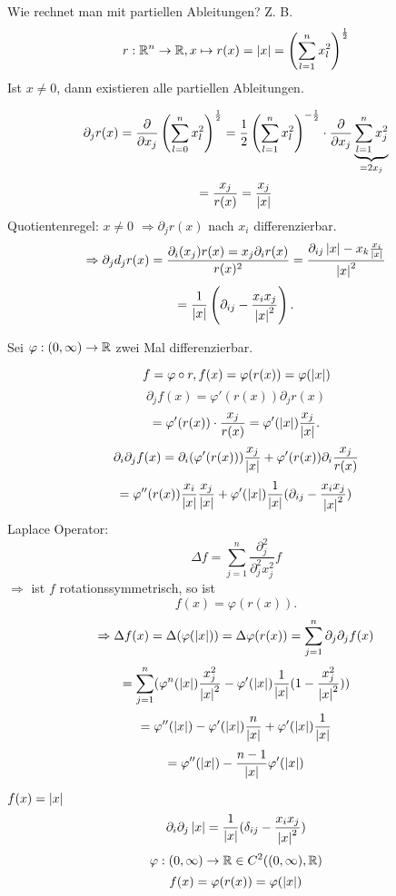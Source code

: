 \documentclass[../ana2.tex]{subfiles}
\begin{document}
Wie rechnet man mit partiellen Ableitungen?
Z. B. \[ r:\mathbb{R}^n\rightarrow \mathbb{R}, x \mapsto r(x) = \left|x\right| 
= \left( \sum_{l=1}^n x_l^2 \right)^{\frac{1}{2}} \]
Ist \( x \neq 0 \), dann existieren alle partiellen Ableitungen.

\[ \partial_j r(x) = \frac{\partial}{\partial x_j} 
\left( \sum_{l=0}^n x_l^2 \right)^{\frac{1}{2}} 
= \frac{1}{2} \left( \sum_{l=1}^n x_l^2 \right)^{-\frac{1}{2}} 
\cdot \frac{\partial}{\partial x_j} \underbrace{\sum_{l=1}^n x_j^2}_{=2x_j} \]
\[ = \frac{x_j}{r(x)} = \frac{x_j}{\left|x\right|} \]
Quotientenregel: \( x \neq 0 \)
\( \Rightarrow \partial_j r(x) \) nach \( x_i \) 
differenzierbar.
\[ \Rightarrow \partial_j d_j r(x) 
= \frac{ \partial_i(x_j) r(x) = x_j \partial_i r(x) }{r(x)^2} 
= \frac{\partial_{ij} \left|x\right| - x_k \frac{x_i}{\left|x\right|}}{\left|x\right|^2} \]
\[ = \frac{1}{\left|x\right|} \left( \partial_{ij} - \frac{x_i x_j}{\left|x\right|^2} \right). \]

Sei \( \varphi:(0,\infty)\rightarrow \mathbb{R} \) zwei Mal differenzierbar. 

\[ f = \varphi \circ r, f(x) = \varphi(r(x)) = \varphi(\left|x\right|) \]
\[ \partial_j f(x) = \varphi'(r(x)) \partial_j r(x) \]
\[ = \varphi'(r(x)) \cdot \frac{x_j}{r(x)} 
= \varphi'(\left|x\right|) \frac{x_j}{\left|x\right|}. \]
\[ \partial_i \partial_j f(x) = \partial_i(\varphi'(r(x))) 
\frac{x_j}{\left|x\right|} + \varphi'(r(x)) \partial_i \frac{x_j}{r(x)} \]
\[ = \varphi''(r(x)) \frac{x_i}{\left|x\right|} \frac{x_j}{\left|x\right|} 
+ \varphi'(\left|x\right|) \frac{1}{\left|x\right|} (\partial_{ij} - \frac{x_i x_j}{\left|x\right|^2}) \]
Laplace Operator:
\[ \Delta f = \sum_{j=1}^n \frac{\partial_j^2}{\partial_j^2 x_j^2} f \]
\( \Rightarrow \) ist \(f\) rotationssymmetrisch, so ist 
\[ f(x) = \varphi(r(x)). \]
\[ \Rightarrow \Delta f(x) = \Delta(\varphi(\left|x\right|)) 
= \Delta \varphi(r(x)) = \sum_{j=1}^n 
\partial_j \partial_j f(x) \]
\[ = \sum_{j=1}^n (\varphi^n(\left|x\right|) \frac{x_j^2}{\left|x\right|^2} 
- \varphi'(\left|x\right|) \frac{1}{\left|x\right|} (1 - \frac{x_j^2}{\left|x\right|^2}) ) \]
\[ = \varphi''(\left|x\right|) - \varphi'(\left|x\right|) \frac{n}{\left|x\right|} 
+ \varphi'(\left|x\right|) \frac{1}{\left|x\right|} \]
\[ = \varphi''(\left|x\right|) - \frac{n-1}{\left|x\right|} \varphi'(\left|x\right|) \]

\( f(x) = \left|x\right| \)
\[ \partial_i \partial_j \left|x\right| 
= \frac{1}{\left|x\right|} (\delta_{ij} - \frac{x_i x_j}{\left|x\right|^2}) \]
\[ \varphi:(0,\infty)\rightarrow \mathbb{R} \in C^2((0,\infty), \mathbb{R}) \]
\[ f(x) = \varphi(r(x)) = \varphi(\left|x\right|) \]
\end{document}
